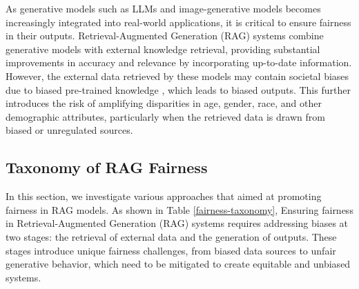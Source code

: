 As generative models such as LLMs and image-generative models becomes increasingly integrated into real-world applications, it is critical to ensure fairness in their outputs. Retrieval-Augmented Generation (RAG) systems combine generative models with external knowledge retrieval, providing substantial improvements in accuracy and relevance by incorporating up-to-date information. However, the external data retrieved by these models may contain societal biases due to biased pre-trained knowledge \cite{wang2022revise, birhane2021large, birhane2021multimodal}, which leads to biased outputs. This further introduces the risk of amplifying disparities in age, gender, race, and other demographic attributes, particularly when the retrieved data is drawn from biased or unregulated sources.

\subsection{Taxonomy of RAG Fairness}
 In this section, we investigate various approaches that aimed at promoting fairness in RAG models. As shown in Table \ref{fairness-taxonomy}, Ensuring fairness in Retrieval-Augmented Generation (RAG) systems requires addressing biases at two stages: the retrieval of external data and the generation of outputs. These stages introduce unique fairness challenges, from biased data sources to unfair generative behavior, which need to be mitigated to create equitable and unbiased systems.

